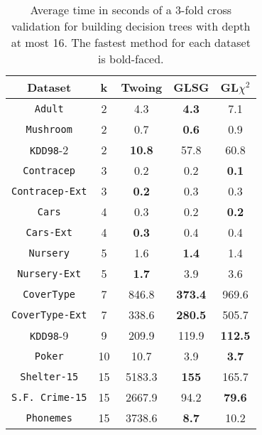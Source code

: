 \begin{table}[]
\small
\caption{Average time in seconds of a 3-fold cross validation
for building decision trees with depth at most 16.
The fastest method for each dataset is bold-faced.}
\centering
\begin{tabular}{c|c|c|c|c}
Dataset             & k  & Twoing        & GLSG      & GL$\chi^2$   \\ \hline
{\tt Adult}         & 2  & 4.3           & {\bf 4.3} & 7.1          \\
{\tt Mushroom}      & 2  & 0.7           & {\bf 0.6} & 0.9          \\
{\tt KDD98}-2       & 2  & {\bf 10.8}    & 57.8      & 60.8         \\
{\tt Contracep}     & 3  & 0.2           & 0.2       & {\bf 0.1}    \\
{\tt Contracep-Ext} & 3  & {\bf 0.2}     & 0.3       & 0.3          \\
{\tt Cars}          & 4  & 0.3           & 0.2       & {\bf 0.2}    \\
{\tt Cars-Ext}      & 4  & {\bf 0.3}     & 0.4       & 0.4          \\
{\tt Nursery}       & 5  & 1.6           &  {\bf 1.4}      &  1.4        \\
{\tt Nursery-Ext}   & 5  & {\bf 1.7}           &  3.9 & 3.6          \\
{\tt CoverType}     & 7  & 846.8         &{\bf 373.4}& 969.6        \\
{\tt CoverType-Ext} & 7  & 338.6         &{\bf 280.5}& 505.7        \\
{\tt KDD98}-9       & 9  & 209.9         & 119.9     & {\bf 112.5}  \\
{\tt Poker}         & 10 & 10.7          & 3.9       & {\bf 3.7}    \\ 
{\tt Shelter-15}    & 15 & 5183.3        &{\bf 155}  & 165.7        \\   
{\tt S.F. Crime-15} & 15 & 2667.9        & 94.2      &{\bf 79.6}    \\ 
{\tt Phonemes}      & 15 & 3738.6        &{\bf 8.7}  & 10.2         
\end{tabular}
\label{tab:time}
\end{table}


